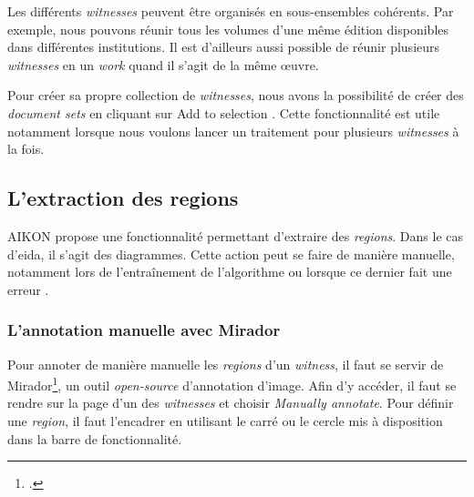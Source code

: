 Les différents \textit{witnesses} peuvent être organisés en sous-ensembles cohérents. Par exemple, nous pouvons réunir tous les volumes d'une même édition disponibles dans différentes institutions. Il est d'ailleurs aussi possible de réunir plusieurs \textit{witnesses} en un \textit{work} quand il s'agit de la même œuvre.

Pour créer sa propre collection de \textit{witnesses}, nous avons la possibilité de créer des \textit{document sets} en cliquant sur \og Add to selection \fg. Cette fonctionnalité est utile notamment lorsque nous voulons lancer un traitement pour plusieurs \textit{witnesses} à la fois.


\subsection{L'extraction des regions}

AIKON propose une fonctionnalité permettant d'extraire des \textit{regions}. Dans le cas d'\gls{eida}, il s'agit des diagrammes. Cette action peut se faire de manière manuelle, notamment lors de l'entraînement de l'algorithme ou lorsque ce dernier fait une erreur . 


\subsubsection{L'annotation manuelle avec Mirador}

Pour annoter de manière manuelle les \textit{regions} d'un \textit{witness}, il faut se servir de Mirador\footcite{MiradorHome}, un outil \textit{open-source} d'annotation d'image. Afin d'y accéder, il faut se rendre sur la page d'un des \textit{witnesses} et choisir \og \textit{Manually annotate}\fg. Pour définir une \textit{region}, il faut l'encadrer en utilisant le carré ou le cercle mis à disposition dans la barre de fonctionnalité. 

